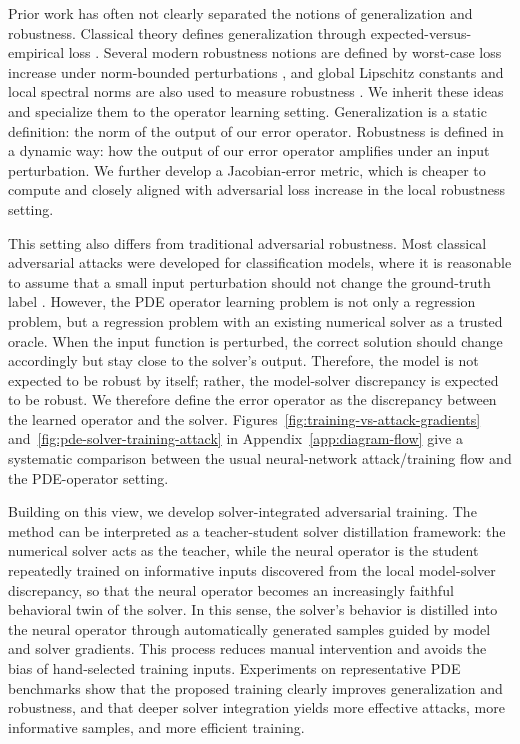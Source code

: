 \documentclass[letterpaper]{article} %
\newcommand{\figrefs}[2]{Figures~\ref{#1} and~\ref{#2}}
\newcommand{\appref}[1]{Appendix~\ref{#1}}
\begin{document}
Prior work has often not clearly separated the notions of generalization and
robustness.
Classical theory defines generalization through expected-versus-empirical loss
\citep{bousquet2002stability,xu2012robustness}. Several modern robustness
notions are defined by worst-case loss increase under norm-bounded
perturbations \citep{madry2018towards}, and global Lipschitz constants and
local spectral norms are also used to measure robustness
\citep{cisse2017parseval,huang2026stablepdenet}. We inherit these ideas and
specialize them to the operator learning setting. Generalization is a static
definition: the norm of the output of our error operator. Robustness is defined
in a dynamic way: how the output of our error operator amplifies under an input
perturbation. We further develop a Jacobian-error metric, which is cheaper to
compute and closely aligned with adversarial loss increase in the local
robustness setting.

This setting also differs from traditional adversarial robustness. Most
classical adversarial attacks were developed for classification models, where it
is reasonable to assume that a small input perturbation should not change the
ground-truth label \citep{goodfellow2015explaining,madry2018towards}. However,
the PDE operator learning problem is not only a regression problem, but a
regression problem with an existing numerical solver as a trusted oracle. When
the input function is perturbed, the correct solution should change accordingly
but stay close to the solver's output. Therefore, the model is not expected to
be robust by itself; rather, the model-solver discrepancy is expected to be
robust. We therefore define the error operator as the discrepancy between the
learned operator and the solver.
\figrefs{fig:training-vs-attack-gradients}{fig:pde-solver-training-attack} in
\appref{app:diagram-flow} give a systematic comparison
between the usual neural-network attack/training flow and the PDE-operator
setting.

Building on this view, we develop solver-integrated adversarial training. The
method can be interpreted as a teacher-student solver distillation framework:
the numerical solver acts as the teacher, while the neural operator is the
student repeatedly trained on informative inputs discovered from the local
model-solver discrepancy, so that the neural operator becomes an increasingly
faithful behavioral twin of the solver. In this sense, the solver's behavior is
distilled into the neural operator through automatically generated samples
guided by model and solver gradients. This process reduces manual intervention
and avoids the bias of hand-selected training inputs.
Experiments on representative PDE benchmarks show that the proposed training
clearly improves generalization and robustness, and that deeper solver
integration yields more effective attacks, more informative samples, and more
efficient training.
\end{document}
